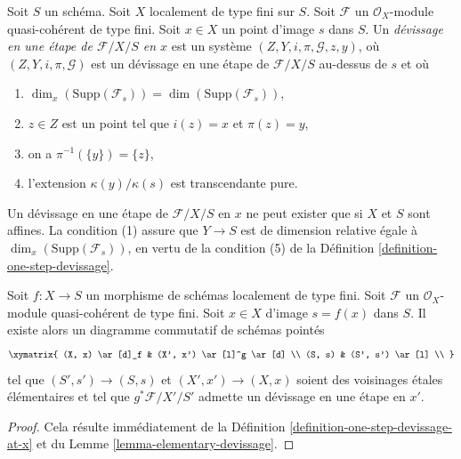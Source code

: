 \begin{definition}
\label{definition-one-step-devissage-at-x}
Soit $S$ un schéma.
Soit $X$ localement de type fini sur $S$.
Soit $\mathcal{F}$ un $\mathcal{O}_X$-module quasi-cohérent de type fini.
Soit $x \in X$ un point d'image $s$ dans $S$.
Un {\it d\'evissage en une étape de $\mathcal{F}/X/S$ en $x$}
est un système $(Z, Y, i, \pi, \mathcal{G}, z, y)$, où
$(Z, Y, i, \pi, \mathcal{G})$ est un d\'evissage en une étape de
$\mathcal{F}/X/S$ au-dessus de $s$ et où
\begin{enumerate}
\item $\dim_x(\text{Supp}(\mathcal{F}_s)) = \dim(\text{Supp}(\mathcal{F}_s))$,
\item $z \in Z$ est un point tel que $i(z) = x$ et $\pi(z) = y$,
\item on a $\pi^{-1}(\{y\}) = \{z\}$,
\item l'extension $\kappa(y)/\kappa(s)$ est transcendante
pure.
\end{enumerate}
\end{definition}

\noindent
Un d\'evissage en une étape de $\mathcal{F}/X/S$ en $x$ ne peut exister que si
$X$ et $S$ sont affines. La condition (1) assure que $Y \to S$ est de
dimension relative égale à $\dim_x(\text{Supp}(\mathcal{F}_s))$,
en vertu de la condition (5) de la
Définition \ref{definition-one-step-devissage}.

\begin{lemma}
\label{lemma-elementary-devissage-variant}
Soit $f : X \to S$ un morphisme de schémas localement de type fini.
Soit $\mathcal{F}$ un $\mathcal{O}_X$-module quasi-cohérent de type fini.
Soit $x \in X$ d'image $s = f(x)$ dans $S$.
Il existe alors un diagramme commutatif de schémas pointés
$$
\xymatrix{
(X, x) \ar[d]_f & (X', x') \ar[l]^g \ar[d] \\
(S, s) & (S', s') \ar[l] \\
}
$$
tel que $(S', s') \to (S, s)$ et $(X', x') \to (X, x)$
soient des voisinages \'etales élémentaires et tel que
$g^*\mathcal{F}/X'/S'$ admette un d\'evissage en une étape en $x'$.
\end{lemma}

\begin{proof}
Cela résulte immédiatement de la
Définition \ref{definition-one-step-devissage-at-x}
et du
Lemme \ref{lemma-elementary-devissage}.
\end{proof}

